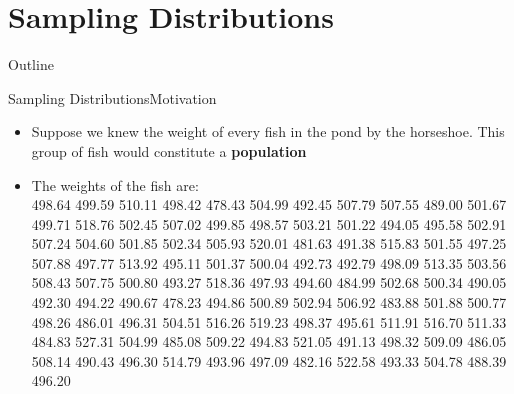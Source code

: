 \documentclass[xcolor=dvipsnames]{beamer}
\begin{document}
\section{Sampling Distributions}
\begin{frame}{Outline}
	\tableofcontents[currentsection,subsectionstyle=show/shaded/hide]
\end{frame}

\begin{frame}{Sampling Distributions}{Motivation}
	\begin{itemize}
		\item Suppose we knew the weight of every fish in the pond by the horseshoe. This group of fish would constitute a \textbf{population}
		\item The weights of the fish are: \\
		498.64 499.59 510.11 498.42 478.43 504.99 492.45 507.79 507.55 489.00 501.67 499.71 518.76 502.45 507.02 499.85
		498.57 503.21 501.22 494.05 495.58 502.91 507.24 504.60 501.85 502.34 505.93 520.01 481.63 491.38 515.83 501.55
		497.25 507.88 497.77 513.92 495.11 501.37 500.04 492.73 492.79 498.09 513.35 503.56 508.43 507.75 500.80 493.27
		518.36 497.93 494.60 484.99 502.68 500.34 490.05 492.30 494.22 490.67 478.23 494.86 500.89 502.94 506.92 483.88
		501.88 500.77 498.26 486.01 496.31 504.51 516.26 519.23 498.37 495.61 511.91 516.70 511.33 484.83 527.31 504.99
		485.08 509.22 494.83 521.05 491.13 498.32 509.09 486.05 508.14 490.43 496.30 514.79 493.96 497.09 482.16 522.58
		493.33 504.78 488.39 496.20
	\end{itemize}
\end{frame}
\end{document}
